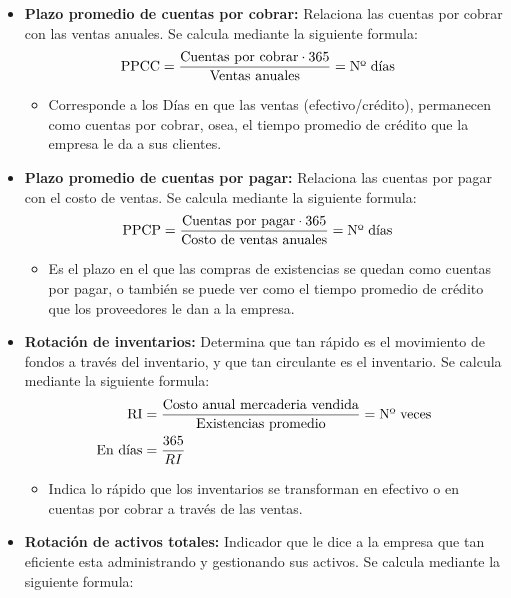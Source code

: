 \documentclass{templateNote}
\begin{document}
\begin{itemize}
    \item \textbf{Plazo promedio de cuentas por cobrar: }Relaciona las cuentas por cobrar con las ventas anuales. Se calcula mediante la siguiente formula:
    \begin{align*}
        \textnormal{PPCC} &= \frac{\textnormal{Cuentas por cobrar} \cdot 365}{\textnormal{Ventas anuales}} = \textnormal{Nº días}
    \end{align*}
    \begin{itemize}
        \item Corresponde a los Días en que las ventas (efectivo/crédito), permanecen como cuentas por cobrar, osea, el tiempo promedio de crédito que la empresa le da a sus clientes.
    \end{itemize}
    \item \textbf{Plazo promedio de cuentas por pagar: }Relaciona las cuentas por pagar con el costo de ventas. Se calcula mediante la siguiente formula:
    \begin{align*}
        \textnormal{PPCP} &= \frac{\textnormal{Cuentas por pagar} \cdot 365}{\textnormal{Costo de ventas anuales}} = \textnormal{Nº días}
    \end{align*}
    \begin{itemize}
        \item Es el plazo en el que las compras de existencias se quedan como cuentas por pagar, o también se puede ver como el tiempo promedio de crédito que los proveedores le dan a la empresa.
    \end{itemize}
    \item \textbf{Rotación de inventarios: }Determina que tan rápido es el movimiento de fondos a través del inventario, y que tan circulante es el inventario. Se calcula mediante la siguiente formula:
    \begin{align*}
        \textnormal{RI} &= \frac{\textnormal{Costo anual mercaderia vendida}}{\textnormal{Existencias promedio}} = \textnormal{Nº veces} \\
        \textnormal{En días} &= \frac{365}{RI}
    \end{align*}
    \begin{itemize}
        \item Indica lo rápido que los inventarios se transforman en efectivo o en cuentas por cobrar a través de las ventas.
    \end{itemize}
    \item \textbf{Rotación de activos totales:} Indicador que le dice a la empresa que tan eficiente esta administrando y gestionando sus activos. Se calcula mediante la siguiente formula:

\end{itemize}
\end{document}
